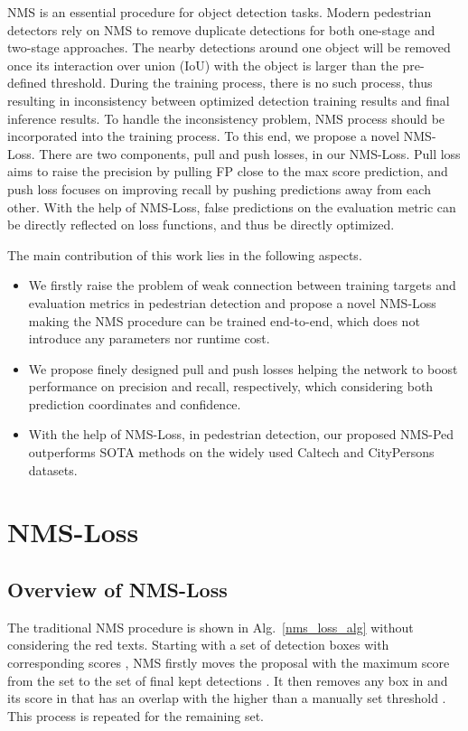 \documentclass[sigconf]{acmart}
\begin{document}
NMS is an essential procedure for object detection tasks. Modern pedestrian detectors rely on NMS to remove duplicate detections for both one-stage and two-stage approaches. The nearby detections around one object will be removed once its interaction over union (IoU) with the object is larger than the pre-defined threshold. During the training process, there is no such process, thus resulting in inconsistency between optimized detection training results and final inference results. To handle the inconsistency problem, NMS process should be incorporated into the training process. To this end, we propose a novel NMS-Loss. There are two components, pull and push losses, in our NMS-Loss. Pull loss aims to raise the precision by pulling FP close to the max score prediction, and push loss focuses on improving recall by pushing predictions away from each other. With the help of NMS-Loss, false predictions on the evaluation metric can be directly reflected on loss functions, and thus be directly optimized.

The main contribution of this work lies in the following aspects.
\begin{itemize}
    \item We firstly raise the problem of weak connection between training targets and evaluation metrics in pedestrian detection and propose a novel NMS-Loss making the NMS procedure can be trained end-to-end, which does not introduce any parameters nor runtime cost.
    \item We propose finely designed pull and push losses helping the network to boost performance on precision and recall, respectively, which considering both prediction coordinates and confidence.
    \item With the help of NMS-Loss, in pedestrian detection, our proposed NMS-Ped outperforms SOTA methods on the widely used Caltech and CityPersons datasets.
\end{itemize}

\section{NMS-Loss}
\subsection{Overview of NMS-Loss}

The traditional NMS procedure is shown in Alg.~\ref{nms_loss_alg} without considering the red texts. Starting with a set of detection boxes  with corresponding scores , NMS firstly moves the proposal  with the maximum score from the set  to the set of final kept detections . It then removes any box in  and its score in  that has an overlap with the  higher than a manually set threshold . This process is repeated for the remaining  set.
\end{document}
